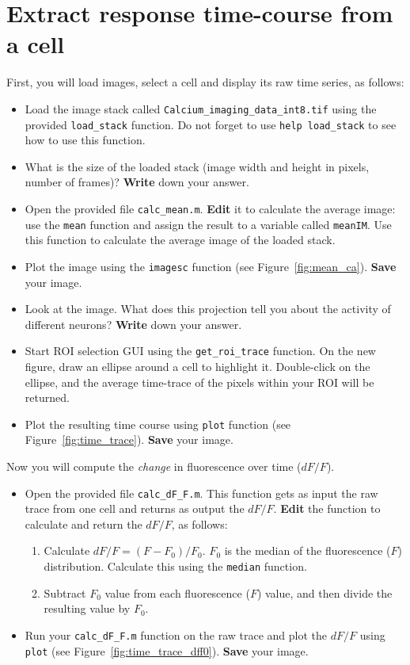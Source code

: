 \documentclass[paper=a4, fontsize=11pt]{article} %
\numberwithin{equation}{section} %
\numberwithin{figure}{section} %
\numberwithin{table}{section} %
\begin{document}
\section{Extract response time-course from a cell}

First, you will load images, select a cell and display its raw time series, as follows:

\begin{itemize}
\item Load the image stack called \texttt{Calcium\_imaging\_data\_int8.tif} using the provided \texttt{load\_stack} function.
  Do not forget to use \texttt{help load\_stack} to see how to use this function.
\item What is the size of the loaded stack (image width and height in pixels, number of frames)? \textbf{Write} down your answer.
  \vspace{1em}
\item Open the provided file \texttt{calc\_mean.m}. \textbf{Edit} it to calculate the average image: use the \texttt{mean} function and assign the result to a variable called \texttt{meanIM}. Use this function to calculate the average image of the loaded stack.
\item Plot the image using the \texttt{imagesc} function (see Figure~\ref{fig:mean_ca}). \textbf{Save} your image.
\item Look at the image. What does this projection tell you about the activity of different neurons? \textbf{Write} down your answer.
  \vspace{2em}
\item Start ROI selection GUI using the \texttt{get\_roi\_trace} function. On the new figure, draw an ellipse around a cell to highlight it. Double-click on the ellipse, and the average time-trace of the pixels within your ROI will be returned.
\item Plot the resulting time course using \texttt{plot} function (see Figure~\ref{fig:time_trace}). \textbf{Save} your image.
\end{itemize}

Now you will compute the \textit{change} in fluorescence over time ($dF/F$).
\begin{itemize}
\item Open the provided file \texttt{calc\_dF\_F.m}. This function gets as input the raw trace from one cell and returns as output the $dF/F$. \textbf{Edit} the function to calculate and return the $dF/F$, as follows:
  \begin{enumerate}
  \item Calculate $dF/F = (F-F_0)/F_0$. $F_0$ is the median of the fluorescence ($F$) distribution. Calculate this using the \texttt{median} function.
  \item Subtract $F_0$ value from each fluorescence ($F$) value, and then divide the resulting value by $F_0$.
  \end{enumerate}
\item Run your \texttt{calc\_dF\_F.m} function on the raw trace and plot the $dF/F$ using \texttt{plot} (see Figure~\ref{fig:time_trace_dff0}). \textbf{Save} your image.
\end{itemize}
\end{document}
